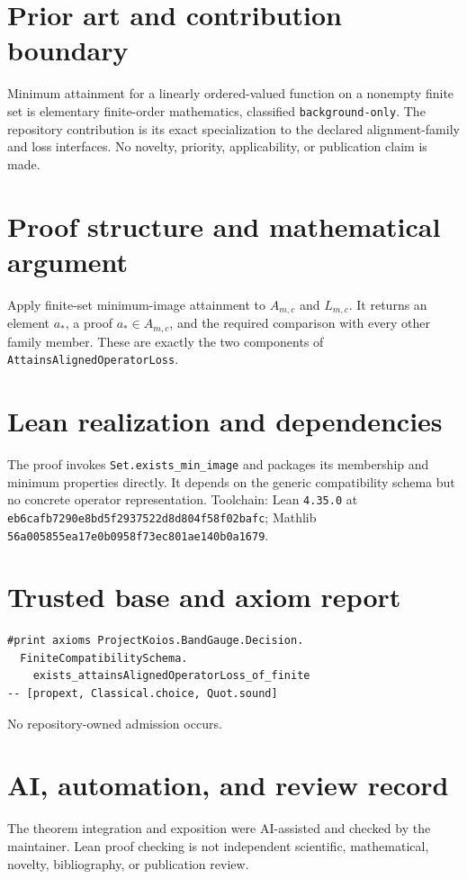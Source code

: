 \documentclass[11pt]{article}
\begin{document}
\section{Prior art and contribution boundary}
Minimum attainment for a linearly ordered-valued function on a nonempty finite set is elementary finite-order mathematics, classified \texttt{background-only}.  The repository contribution is its exact specialization to the declared alignment-family and loss interfaces.  No novelty, priority, applicability, or publication claim is made.

\section{Proof structure and mathematical argument}
Apply finite-set minimum-image attainment to $A_{m,c}$ and $L_{m,c}$.  It returns an element $a_*$, a proof $a_*\in A_{m,c}$, and the required comparison with every other family member.  These are exactly the two components of \texttt{AttainsAlignedOperatorLoss}.

\section{Lean realization and dependencies}
The proof invokes \texttt{Set.exists\_min\_image} and packages its membership and minimum properties directly.  It depends on the generic compatibility schema but no concrete operator representation.  Toolchain: Lean \texttt{4.35.0} at \texttt{eb6cafb7290e8bd5f2937522d8d804f58f02bafc}; Mathlib \texttt{56a005855ea17e0b0958f73ec801ae140b0a1679}.

\section{Trusted base and axiom report}
\begin{verbatim}
#print axioms ProjectKoios.BandGauge.Decision.
  FiniteCompatibilitySchema.
    exists_attainsAlignedOperatorLoss_of_finite
-- [propext, Classical.choice, Quot.sound]
\end{verbatim}
No repository-owned admission occurs.

\section{AI, automation, and review record}
The theorem integration and exposition were AI-assisted and checked by the maintainer.  Lean proof checking is not independent scientific, mathematical, novelty, bibliography, or publication review.
\end{document}
